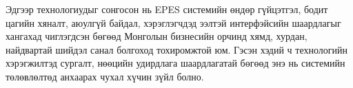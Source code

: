 Эдгээр технологиудыг сонгосон нь EPES системийн өндөр гүйцэтгэл, бодит цагийн хяналт, аюулгүй байдал, хэрэглэгчдэд ээлтэй интерфэйсийн шаардлагыг хангахад чиглэгдсэн 
бөгөөд Монголын бизнесийн орчинд хямд, хурдан, найдвартай шийдэл санал болгоход тохиромжтой юм. Гэсэн хэдий ч технологийн хэрэгжилтэд сургалт, нөөцийн удирдлага 
шаардлагатай бөгөөд энэ нь системийн төлөвлөлтөд анхаарах чухал хүчин зүйл болно.